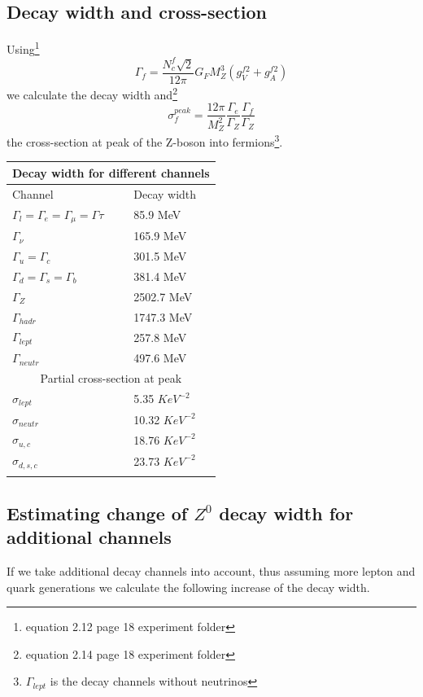 \documentclass[]{article}
\begin{document}
\subsection{Decay width and cross-section}
Using\footnote{equation 2.12 page 18 experiment folder}
\begin{equation}
\Gamma_f = \frac{N^f_c \sqrt{2}}{12 \pi} G_F M_Z^3(g_V^{f2} + g_A^{f2})
\end{equation}
we calculate the decay width and\footnote{equation 2.14 page 18 experiment folder}
\begin{equation}
\sigma^{peak}_f= \frac{12 \pi}{M_Z^2} \frac{\Gamma_e}{\Gamma_Z}\frac{\Gamma_f}{\Gamma_Z}
\label{eq:214}
\end{equation}
the cross-section at peak of the Z-boson into fermions\footnote{$\Gamma_{lept}$ is the decay channels without neutrinos}.

\begin{tabular}{ |p{3cm}||p{3cm}|  }
 \hline
 \multicolumn{2}{|c|}{Decay width for different channels} \\
 \hline
 Channel & Decay width \\
 \hline
  $\Gamma_l = \Gamma_e = \Gamma_{\mu} = \Gamma{\tau} $   & 85.9 MeV   \\
  $\Gamma_{\nu} $   & 165.9 MeV   \\
  $\Gamma_u = \Gamma_c $   & 301.5 MeV   \\
  $\Gamma_d = \Gamma_s = \Gamma_b $   & 381.4 MeV   \\
  \hline
  $\Gamma_Z $   & 2502.7 MeV   \\
  $\Gamma_{hadr} $   & 1747.3 MeV   \\
  $\Gamma_{lept} $   & 257.8  MeV   \\
  $\Gamma_{neutr} $   & 497.6  MeV   \\
 \hline
 \hline
 \multicolumn{2}{|c|}{Partial cross-section at peak} \\
 \hline
  $\sigma_{lept} $   & 5.35 $KeV^{-2}$   \\
  $\sigma_{neutr} $   & 10.32 $KeV^{-2}$   \\
  $\sigma_{u, c} $   & 18.76 $KeV^{-2}$   \\
  $\sigma_{d,s,c} $   & 23.73 $KeV^{-2}$   \\
 \hline
 \label{tbl:theo-width}
\end{tabular}

\subsection{Estimating change of $Z^0$ decay width for additional channels}
If we take additional decay channels into account, thus assuming more lepton and quark generations we calculate the following increase of the decay width.
\end{document}
